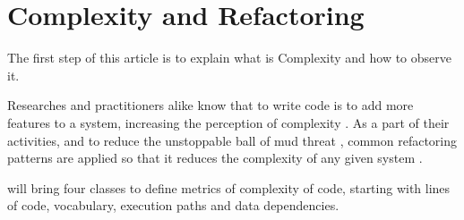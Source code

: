 \section{Complexity and Refactoring}

The first step of this article is to explain what is Complexity and how to observe it.



Researches and practitioners alike know that to write code is to add more features to a system, increasing the
perception of complexity \cite{book:menmonth}. As a part of their activities, and to reduce the unstoppable ball of mud
threat \cite{book:softarch}, common refactoring patterns are applied so that it reduces the complexity of any given
system \cite{book:refactoring}.

\cite{article:fmricc} will bring four classes to define metrics of complexity of code, starting with lines of code,
vocabulary, execution paths and data dependencies.
